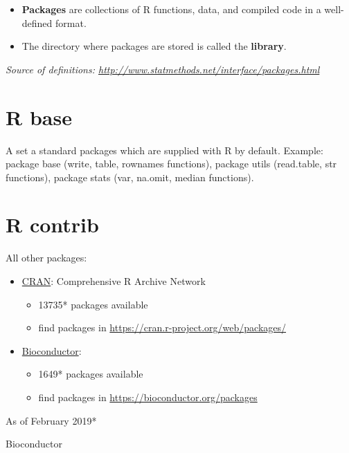 \documentclass[]{book}
\providecommand{\tightlist}{%
  \setlength{\itemsep}{0pt}\setlength{\parskip}{0pt}}
\begin{document}
\begin{itemize}
\item
  \textbf{Packages} are collections of R functions, data, and compiled code in a well-defined format.
\item
  The directory where packages are stored is called the \textbf{library}.
\end{itemize}

\emph{Source of definitions: \url{http://www.statmethods.net/interface/packages.html}}

\hypertarget{r-base}{%
\section{R base}\label{r-base}}

A set a standard packages which are supplied with R by default.
Example: package base (write, table, rownames functions), package utils (read.table, str functions), package stats (var, na.omit, median functions).

\hypertarget{r-contrib}{%
\section{R contrib}\label{r-contrib}}

All other packages:

\begin{itemize}
\tightlist
\item
  \href{https://cran.r-project.org}{CRAN}: Comprehensive R Archive Network

  \begin{itemize}
  \tightlist
  \item
    13735* packages available
  \item
    find packages in \url{https://cran.r-project.org/web/packages/}
  \end{itemize}
\item
  \href{https://www.bioconductor.org/}{Bioconductor}:

  \begin{itemize}
  \tightlist
  \item
    1649* packages available
  \item
    find packages in \url{https://bioconductor.org/packages}
  \end{itemize}
\end{itemize}

\emph{}As of February 2019*

Bioconductor
\end{document}
